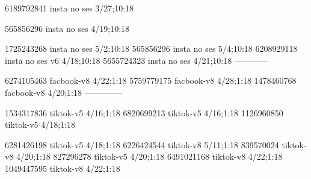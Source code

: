 
6189792841 insta no ses
3/27;10:18

565856296 insta no ses
4/19;10:18

1725243268 insta no ses
5/2;10:18
565856296 insta no ses
5/4;10:18
6208929118 insta no ses v6
4/18;10:18
5655724323 insta no ses
4/21;10:18
------------

6274105463 facbook-v8
4/22;1:18
5759779175 facbook-v8
4/28;1:18
1478460768 facbook-v8
4/20;1:18
--------------

1534317836 tiktok-v5
4/16;1:18
6820699213 tiktok-v5
4/16;1:18
1126960850 tiktok-v5
4/18;1:18

6281426198 tiktok-v5
4/18;1:18
6226424544 tiktok-v8
5/11;1:18
839570024 tiktok-v8
4/20;1:18
827296278 tiktok-v5
4/20;1:18
6491021168 tiktok-v8
4/22;1:18
1049447595 tiktok-v8
4/22;1:18
